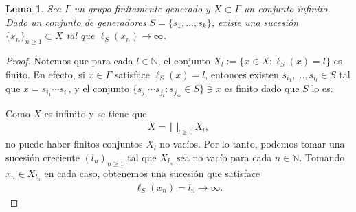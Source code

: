 \documentclass[11pt]{article}
\theoremstyle{colored}
\newtheorem{lemma}{Lema}
\newcommand{\N}{\mathbb{N}}
\begin{document}
\begin{lemma} Sea $\Gamma$ un grupo finitamente generado y $X \subset \Gamma$ un conjunto infinito. Dado un conjunto de generadores $S = \{s_1, \dots, s_k\}$, existe una sucesión $\{x_n\}_{n \geq 1} \subset X$ tal que $\ell_S(x_n) \to \infty$.
\end{lemma}
\begin{proof} Notemos que para cada $l \in \N$, el conjunto $X_l := \{x \in X : \ell_S(x) = l\}$ es finito. En efecto, si $x \in \Gamma$ satisface $\ell_S(x) = l$, entonces existen $s_{i_1}, \dots, s_{i_l} \in S$ tal que $x = s_{i_1} \cdots s_{i_l}$, y el conjunto $\{s_{j_1} \cdots s_{j_l} : s_{j_m} \in S\} \ni x$ es finito dado que $S$ lo es. 

Como $X$ es infinito y se tiene que 
\begin{align*}
X = \bigsqcup_{l \geq 0}X_l,
\end{align*}
no puede haber finitos conjuntos $X_l$ no vacíos. Por lo tanto, podemos tomar una sucesión creciente $(l_n)_{n \geq 1}$ tal que $X_{l_n}$ sea no vacío para cada $n \in \N$. Tomando $x_n \in X_{l_n}$ en cada caso, obtenemos una sucesión que satisface
\begin{align*}
\ell_S(x_n) = l_n \to \infty.
\end{align*}
\end{proof}
\end{document}
